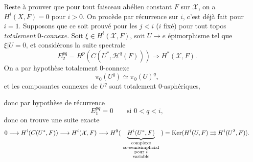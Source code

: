 Reste à prouver que pour tout faisceau  abélien constant $F$ sur $\mathcal{X}$, on a $H^i(X,F)=0$ pour $i>0$. On procède par récurrence sur $i$, c'est déjà fait pour $i=1$. Supposons que ce soit prouvé pour les $j<i$ ($i$ fixé) pour tout topos \textit{totalement} 0\textit{-connexe.} Soit $\xi \in H^i(\mathcal{X},F)$, soit $U \longrightarrow e$ épimorphisme tel que $\xi|U=0$, et considérons la suite spectrale %
\[
E_2^{pq} = H^p(C(U^*,\mathcal{H}^q(F))) \Longrightarrow H^*(\mathcal{X},F).
\]
On a par hypothèse totalement 0-connexe
\[
\pi_0(U^q) \simeq \pi_0(U)^q, \tag*{$(*)$}
\]
et les composantes connexes de $U^q$ sont totalement 0-asphériques,
\begin{center}
\end{center}
donc par hypothèse de récurrence
\[
E_1^{pq} = 0 \qquad \text{si } 0<q<i,
\]
donc on trouve une suite exacte
\[
0 \longrightarrow H^i(C(U^*,F)) \longrightarrow H^i(\mathcal{X},F) \longrightarrow H^0(\ \underbrace{H^i(U^*,F)}_{\substack{\text{complexe}\\ \text{co-semisimplicial}\\ \text{pour } i\\ \text{variable}}}\ ) = \Ker(H^i(U,F) \rightrightarrows H^i(U^2,F)).
\]

